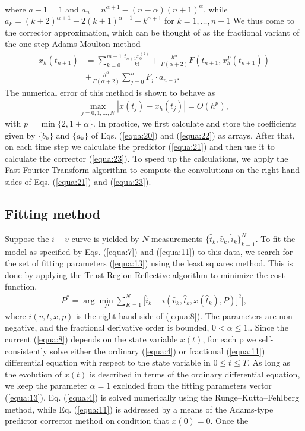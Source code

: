 \documentclass[10pt]{article}
\begin{document}
\begin{multicols}{2}
\begin{align}
        \end{align}
        where $a-1 = 1$ and $a_n = n^{\alpha + 1}-(n-\alpha)(n+1)^\alpha$, while $a_k = (k+2)^{\alpha + 1} - 2(k+1)^{\alpha + 1} + k^{\alpha + 1}$ for $k = 1, \dots, n-1$ We thus come to the corrector approximation, which can be thought of as the fractional variant of the one-step Adams-Moulton method
        \begin{align}
            x_h(t_{n+1}) & = \sum_{k=0}^{m-1} \frac{t_{n+1}x_0^{(k)}}{k!} + \frac{h^\alpha}{\Gamma (\alpha + 2)}  F(t_{n+1}, x_h^P (t_{n+1})) \nonumber \\ &+ \frac{h^\alpha}{\Gamma (\alpha + 2)} \sum_{j=0}^n F_j \cdot a_{n-j}. \label{equa:23}
        \end{align}
        The numerical error of this method is shown to behave as
        \begin{align}
            \max_{j=0,1,\dots,N} |x(t_j)-x_h(t_j)|=O(h^p), \label{equa:24}
        \end{align}
        with $p=\min\{2,1+\alpha\}$. In practice, we first calculate and store the coefficients given by $\{b_k\}$ and $\{a_k\}$ of Eqs. (\ref{equa:20}) and (\ref{equa:22}) as arrays. After that, on each time step we calculate the predictor (\ref{equa:21}) and then use it to calculate the corrector (\ref{equa:23}). To speed up the calculations, we apply the Fast Fourier Transform algorithm to compute the convolutions on the right-hand sides of Eqs. (\ref{equa:21}) and (\ref{equa:23}).
        \par
        \medskip
        {\centering \subsection{ \bfseries Fitting method}}
        Suppose the $i-v$ curve is yielded by $N$ measurements $\{\hat{t}_k, \hat{v}_k, \hat{i}_k\}_{k=1}^N$. To fit the model as specified by Eqs. (\ref{equa:7}) and (\ref{equa:11}) to this data, we search for the set of fitting parameters (\ref{equa:13}) using the least squares method. This is done by applying the Trust Region Reflective algorithm to minimize the cost function,
        \begin{align}
            P^* = \arg \min_P \sum_{K=1}^N \biggl[\hat{i}_k-i(\hat{v}_k,\hat{t}_k, x(\hat{t}_k),P)]^2 \biggr], \label{equa:25}
        \end{align}
        where $i(v, t, x, p)$ is the right-hand side of (\ref{equa:8}). The parameters are non-negative, and the fractional derivative order is bounded, $0 < \alpha \le 1.$. Since the current (\ref{equa:8}) depends on the state variable $x(t)$, for each p we self-consistently solve either the ordinary (\ref{equa:4}) or fractional (\ref{equa:11}) differential equation with respect to the state variable in $0 \le t \le T$. As long as the evolution of $x(t)$ is described in terms of the ordinary differential equation, we keep the parameter $\alpha = 1$ excluded from the fitting parameters vector (\ref{equa:13}). Eq. (\ref{equa:4}) is solved numerically using the Runge–Kutta–Fehlberg method, while Eq. (\ref{equa:11}) is addressed by a means of the Adams-type predictor corrector method on condition that $x(0) = 0$. Once the

\end{multicols}
\end{document}
